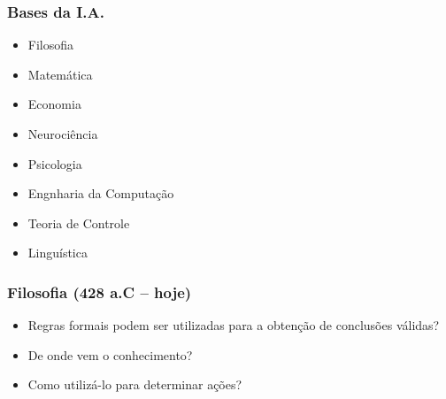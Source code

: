 \documentclass[aspectratio=169]{beamer}
\begin{document}
	\begin{frame}
		\frametitle{Bases da I.A.}
		\begin{itemize}
			\item Filosofia
			\item Matemática
			\item Economia
			\item Neurociência
			\item Psicologia
			\item Engnharia da Computação
			\item Teoria de Controle
			\item Linguística			
		\end{itemize}
	\end{frame}	
	
	\begin{frame}
		\frametitle{Filosofia (428 a.C – hoje)}
		
		\begin{itemize}
			\item Regras formais podem ser utilizadas para a obtenção de conclusões válidas?

			\item De onde vem o conhecimento?

			\item Como utilizá-lo para determinar ações?

		\end{itemize}
	\end{frame}
	
\end{document}

